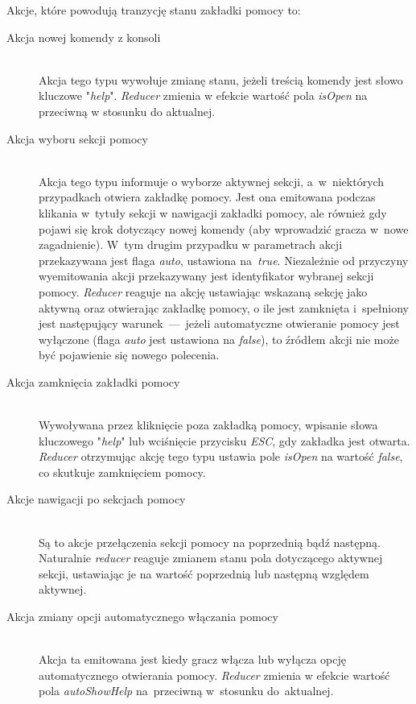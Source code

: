 \documentclass[12pt,a4paper,polish,thesis]{dcsbook}
\begin{document}
{	Akcje, które powodują tranzycję stanu zakładki pomocy to:
	
	\begin{description}
	\item[Akcja nowej komendy z konsoli] \hfill \\
	Akcja tego typu wywołuje zmianę stanu, jeżeli treścią komendy jest słowo kluczowe "\textit{help}". \textit{Reducer} zmienia w efekcie wartość pola \textit{isOpen} na przeciwną w stosunku do aktualnej.
	
	\item[Akcja wyboru sekcji pomocy] \hfill \\
	Akcja tego typu informuje o wyborze aktywnej sekcji, a~w~niektórych przypadkach otwiera zakładkę pomocy. Jest ona emitowana podczas klikania w~tytuły sekcji w nawigacji zakładki pomocy, ale również gdy pojawi się krok dotyczący nowej komendy (aby wprowadzić gracza w~nowe zagadnienie). W~tym drugim przypadku w parametrach akcji przekazywana jest flaga \textit{auto}, ustawiona na~\textit{true}. Niezależnie od przyczyny wyemitowania akcji przekazywany jest identyfikator wybranej sekcji pomocy. \textit{Reducer} reaguje na akcję ustawiając wskazaną sekcję jako aktywną oraz otwierając zakładkę pomocy, o ile jest zamknięta i~spełniony jest następujący warunek~---~jeżeli automatyczne otwieranie pomocy jest wyłączone (flaga \textit{auto} jest ustawiona na \textit{false}), to źródłem akcji nie może być pojawienie się nowego polecenia.
	
	\item[Akcja zamknięcia zakładki pomocy] \hfill \\
	Wywoływana przez kliknięcie poza zakładką pomocy, wpisanie słowa kluczowego "\textit{help}" lub wciśnięcie przycisku \textit{ESC}, gdy zakładka jest otwarta. \textit{Reducer} otrzymując akcję tego typu ustawia pole \textit{isOpen} na wartość \textit{false}, co skutkuje zamknięciem pomocy.
	
	\item[Akcje nawigacji po sekcjach pomocy] \hfill \\
	Są to akcje przełączenia sekcji pomocy na poprzednią bądź następną. Naturalnie \textit{reducer} reaguje zmianem stanu pola dotyczącego aktywnej sekcji, ustawiając je na wartość poprzednią lub następną względem aktywnej.
	
	\item[Akcja zmiany opcji automatycznego włączania pomocy] \hfill \\
	Akcja ta emitowana jest kiedy gracz włącza lub wyłącza opcję automatycznego otwierania pomocy. \textit{Reducer} zmienia w efekcie wartość pola \textit{autoShowHelp} na~przeciwną w~stosunku do~aktualnej.
	\end{description}
	
}
\end{document}
